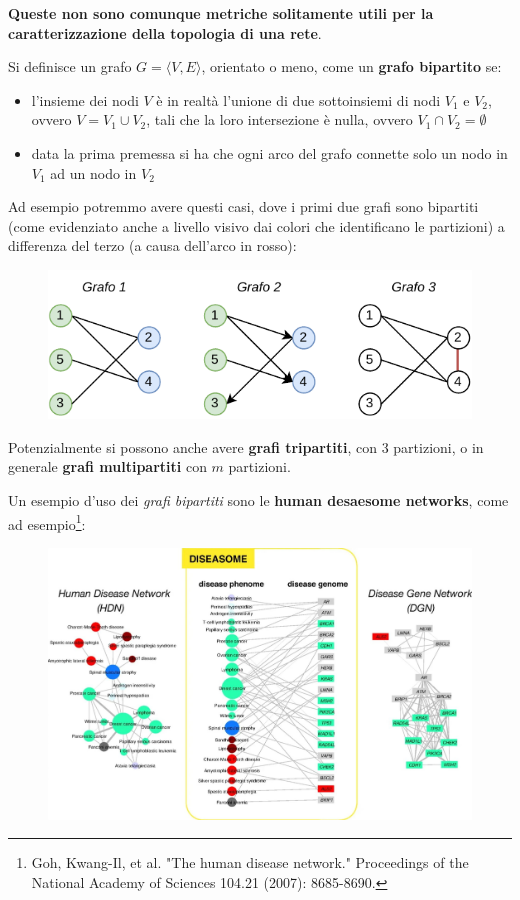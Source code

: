 \documentclass[a4paper,12pt, oneside]{book}
\begin{document}
\textbf{Queste non sono comunque metriche solitamente utili per la
  caratterizzazione della topologia di una rete}.
\begin{definizione}
  Si definisce un grafo $G=\langle V,E\rangle$, orientato o meno, come un
  \textbf{grafo bipartito} se:
  \begin{itemize}
    \item l'insieme dei nodi $V$ è in realtà l'unione di due sottoinsiemi di
    nodi $V_1$ e $V_2$, ovvero $V=V_1\cup V_2$, tali che la loro intersezione è
    nulla, ovvero $V_1\cap V_2=\emptyset$
    \item data la prima premessa si ha che ogni arco del grafo connette solo un
    nodo in $V_1$ ad un nodo in $V_2$
  \end{itemize}
  Ad esempio potremmo avere questi casi, dove i primi due grafi sono bipartiti
  (come evidenziato anche a livello visivo dai colori che identificano le
  partizioni) a differenza del terzo (a causa dell'arco in rosso):
  \begin{figure}[H]
    \centering
    \includegraphics[scale = 1.3]{img/bip.pdf}
  \end{figure}
  Potenzialmente si possono anche avere \textbf{grafi tripartiti}, con 3
  partizioni, o in generale \textbf{grafi multipartiti} con $m$ partizioni.
\end{definizione}
\newpage
Un esempio d'uso dei \textit{grafi bipartiti} sono le \textbf{human desaesome
  networks}, come ad esempio\footnote{Goh, Kwang-Il, et al. "The
  human disease network." Proceedings of the National Academy of Sciences 104.21
  (2007): 8685-8690.}:
\begin{figure}[H]
  \centering
  \includegraphics[scale = 0.7]{img/bi.jpg}
\end{figure}
\end{document}
